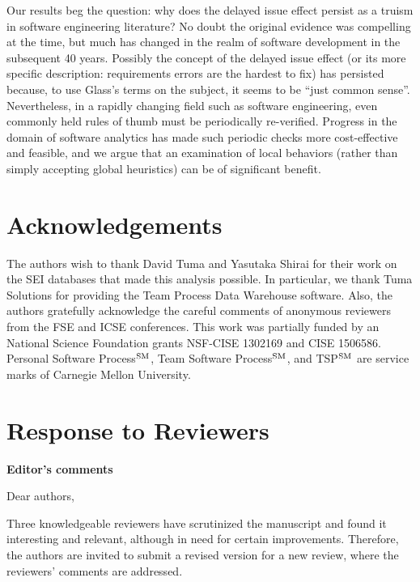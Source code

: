 \documentclass[smallcondensed]{svjour3}
\begin{document}
Our results beg the question: why does the delayed issue effect persist as a truism in software engineering literature? No doubt the original evidence was compelling at the time, but much has changed in the realm of software development in the subsequent 40 years. Possibly the concept of the delayed issue effect (or its more specific description: requirements errors are the hardest to fix)
has persisted because, to use Glass's terms on the subject, it seems to be ``just common sense''\cite{glass02}. 
Nevertheless, in a rapidly changing field such as software engineering, even commonly held rules of thumb must be periodically re-verified. 
Progress in the domain of software analytics has made such periodic checks more cost-effective and feasible, and we argue that an examination of local behaviors (rather than simply accepting global heuristics) can be of significant benefit.

  
 


\section*{Acknowledgements}
The authors wish to thank  David Tuma and  Yasutaka Shirai for their work on the SEI databases
that made this analysis possible.
In particular, we thank Tuma Solutions for providing the Team Process Data Warehouse software.
Also, the authors gratefully acknowledge the careful comments of anonymous reviewers from the
FSE and ICSE conferences.
This work was partially funded by an National Science
Foundation grants NSF-CISE 1302169 and CISE 1506586.
Personal Software Process$\textsuperscript{SM}$, Team Software Process$\textsuperscript{SM}$, and TSP$\textsuperscript{SM}$ are service marks of Carnegie Mellon University.

 
\vspace*{0.5mm} 
\balance

 

\newpage
{}
 \setcounter{page}{1}
 

 \section*{Response to Reviewers}

 
{\bf Editor's comments}
 
Dear authors,

Three knowledgeable reviewers have scrutinized the manuscript
and found it interesting and relevant,  although in need for
certain improvements. Therefore, the authors are
 invited to submit a revised version for a new review, where
 the reviewers' comments
are addressed.
\end{document}

